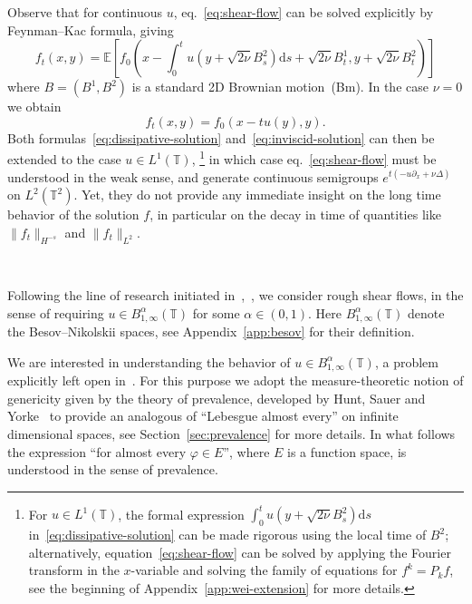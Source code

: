 \documentclass[11pt,oneside,reqno]{amsart}
\newcommand{\mathd}{\mathrm{d}}
\newcommand{\tmtextit}[1]{\text{{\itshape{#1}}}}
\numberwithin{equation}{section}
\begin{document}
Observe that for continuous $u$, eq.~\eqref{eq:shear-flow} can be solved
explicitly by Feynman--Kac formula, giving
\begin{equation}
  f_t (x, y) =\mathbb{E} \left[ f_0 \left( x - \int_0^t u \left( y + \sqrt{2
  \nu} B^2_s \right) \mathd s + \sqrt{2 \nu} B^1_t, y + \sqrt{2 \nu} B^2_t
  \right) \right] \label{eq:dissipative-solution}
\end{equation}
where $B = (B^1, B^2)$ is a standard 2D Brownian motion~(Bm). In the case $\nu
= 0$ we obtain
\begin{equation}
  f_t (x, y) = f_0 (x - t u (y), y) . \label{eq:inviscid-solution}
\end{equation}
Both formulas~\eqref{eq:dissipative-solution} and~\eqref{eq:inviscid-solution}
can then be extended to the case $u \in L^1 (\mathbb{T})$, \footnote{For $u
\in L^1 (\mathbb{T})$, the formal expression $\int_0^t u \left( y + \sqrt{2
\nu} B^2_s \right) \mathd s$ in~\eqref{eq:dissipative-solution} can be made
rigorous using the local time of $B^2$; alternatively,
equation~\eqref{eq:shear-flow} can be solved by applying the Fourier transform
in the $x$-variable and solving the family of equations for $f^k = P_k f$, see
the beginning of Appendix~\ref{app:wei-extension} for more details.} in which
case eq.~\eqref{eq:shear-flow} must be understood in the weak sense, and
generate continuous semigroups $e^{t (- u \partial_x + \nu \Delta)}$ on $L^2
(\mathbb{T}^2)$. Yet, they do not provide any immediate insight on the long
time behavior of the solution $f$, in particular on the decay in time of
quantities like $\| f_t \|_{H^{- s}}$ and $\| f_t \|_{L^2}$.

\

Following the line of research initiated
in~{\cite{wei}},~{\cite{colombozelati}}, we consider rough shear flows, in the
sense of requiring $u \in B^{\alpha}_{1, \infty} (\mathbb{T})$ for some
$\alpha \in (0, 1)$. Here $B^{\alpha}_{1, \infty} (\mathbb{T})$ denote the
Besov--Nikolskii spaces, see Appendix~\ref{app:besov} for their definition.

We are interested in understanding the behavior of \tmtextit{generic} $u \in
B^{\alpha}_{1, \infty} (\mathbb{T})$, a problem explicitly left open
in~{\cite{colombozelati}}. For this purpose we adopt the measure-theoretic
notion of genericity given by the theory of prevalence, developed by Hunt,
Sauer and Yorke~{\cite{huntsauer}} to provide an analogous of ``Lebesgue
almost every'' on infinite dimensional spaces, see
Section~\ref{sec:prevalence} for more details. In what follows the expression
``for almost every $\varphi \in E$'', where $E$ is a function space, is
understood in the sense of prevalence.
\end{document}
